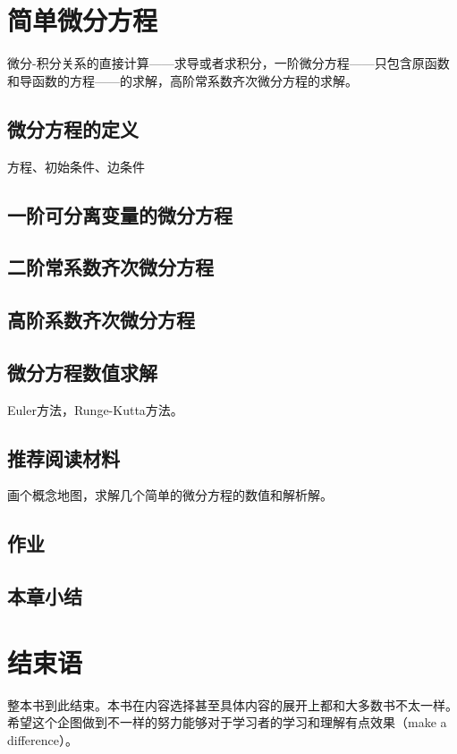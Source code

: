 \documentclass{ctexbook}
\newcommand{\ChapLabel}[1]{\label{#1}}
\begin{document}
\chapter{简单微分方程}
\ChapLabel{Chap:DiffEqu}
微分-积分关系的直接计算——求导或者求积分，一阶微分方程——只包含原函数和导函数的方程——的求解，高阶常系数齐次微分方程的求解。

\section{微分方程的定义}
方程、初始条件、边条件

\section{一阶可分离变量的微分方程}

\section{二阶常系数齐次微分方程}

\section{高阶系数齐次微分方程}

\section{微分方程数值求解}
Euler方法，Runge-Kutta方法。

\section{推荐阅读材料}
画个概念地图，求解几个简单的微分方程的数值和解析解。

\section{作业}

\section{本章小结}

\chapter*{结束语}
整本书到此结束。本书在内容选择甚至具体内容的展开上都和大多数书不太一样。希望这个企图做到不一样的努力能够对于学习者的学习和理解有点效果（make a difference）。 
\end{document}
